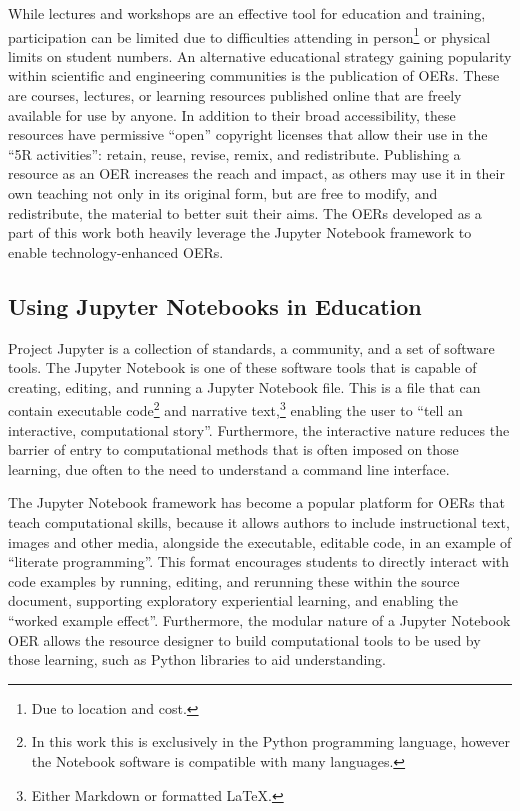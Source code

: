 While lectures and workshops are an effective tool for education and training, participation can be limited due to difficulties attending in person\footnote{Due to location and cost.} or physical limits on student numbers.
An alternative educational strategy gaining popularity within scientific and engineering communities is the publication of OERs. 
These are courses, lectures, or learning resources published online that are freely available for use by anyone.
In addition to their broad accessibility, these resources have permissive ``open'' copyright licenses that allow their use in the ``5R activities'': retain, reuse, revise, remix, and redistribute.\autocite{wiley_open_nodate}
Publishing a resource as an OER increases the reach and impact, as others may use it in their own teaching not only in its original form, but are free to modify, and redistribute, the material to better suit their aims.
The OERs developed as a part of this work both heavily leverage the Jupyter Notebook framework\autocite{kluyver_jupyter_2016} to enable technology-enhanced OERs.

\subsection{Using Jupyter Notebooks in Education}
Project Jupyter\autocite{kluyver_jupyter_2016} is a collection of standards, a community, and a set of software tools.
The Jupyter Notebook is one of these software tools that is capable of creating, editing, and running a Jupyter Notebook file.
This is a file that can contain executable code\footnote{In this work this is exclusively in the Python programming language, however the Notebook software is compatible with many languages.} and narrative text,\footnote{Either Markdown or formatted \LaTeX.} enabling the user to ``tell an interactive, computational story''.\autocite{barba_teaching_2019}
Furthermore, the interactive nature reduces the barrier of entry to computational methods that is often imposed on those learning, due often to the need to understand a command line interface.

The Jupyter Notebook framework has become a popular platform for OERs that teach computational skills, because it allows authors to include instructional text, images and other media, alongside the executable, editable code, in an example of ``literate programming''.\autocite{knuth_literate_1984}
This format encourages students to directly interact with code examples by running, editing, and rerunning these within the source document,\autocite{barba_cybertraining_2017} supporting exploratory experiential learning,\autocite{papert_mindstroms_1993} and enabling the ``worked example effect''.\autocite{tarmizi_guidance_1988}
Furthermore, the modular nature of a Jupyter Notebook OER allows the resource designer to build computational tools to be used by those learning, such as Python libraries to aid understanding.

